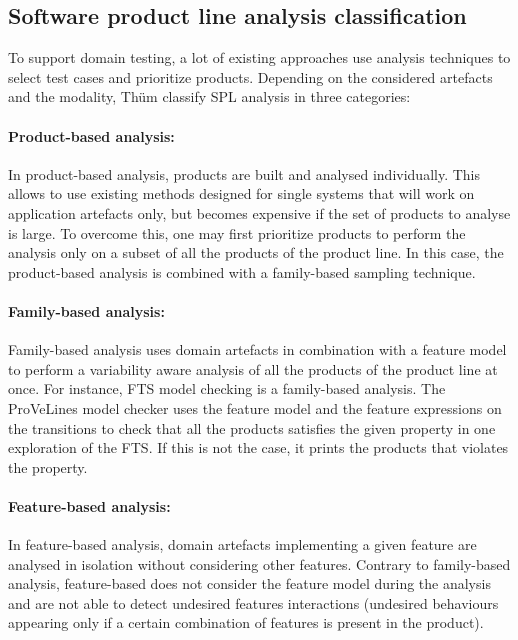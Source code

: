 \subsection{Software product line analysis classification}

To support domain testing, a lot of existing approaches use analysis techniques to select test cases and prioritize products. Depending on the considered artefacts and the modality, Th\"um \etal \cite{Thum2014} classify \gls{SPL} analysis in three categories:

\paragraph{Product-based analysis:} 

In product-based analysis, products are built and analysed individually. This allows to use existing methods designed for single systems that will work on application artefacts only, but becomes expensive if the set of products to analyse is large. To overcome this, one may first prioritize products to perform the analysis only on a subset of all the products of the product line. In this case, the product-based analysis is combined with a family-based sampling technique. 

\paragraph{Family-based analysis:} 

Family-based analysis uses domain artefacts in combination with a feature model to perform a variability aware analysis of all the products of the product line at once. For instance, FTS model checking \cite{Classen2013b} is a family-based analysis. The ProVeLines \cite{Cordy2013} model checker uses the feature model and the feature expressions on the transitions to check that all the products satisfies the given property in one exploration of the FTS. If this is not the case, it prints the products that violates the property.

\paragraph{Feature-based analysis:} 

In feature-based analysis, domain artefacts implementing a given feature are analysed in isolation without considering other features. Contrary to family-based analysis, feature-based does not consider the feature model during the analysis and are not able to detect undesired features interactions \cite{Zave1993} (\ie undesired behaviours appearing only if a certain combination of features is present in the product).

